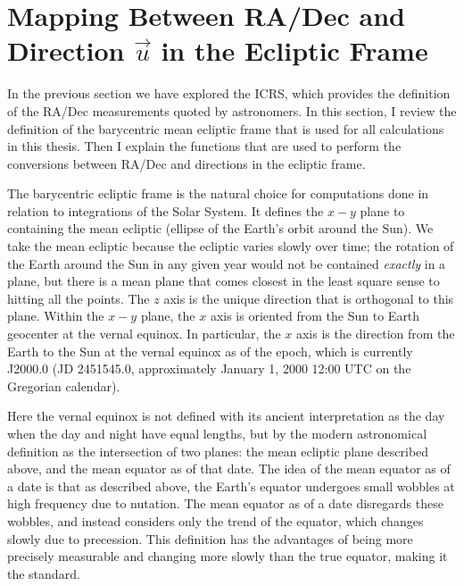 \section{Mapping Between RA/Dec and Direction $\vec{u}$ in the Ecliptic Frame}
\label{section_ra_dec_to_dir}
In the previous section we have explored the ICRS, which provides the definition of the RA/Dec measurements quoted by astronomers.
In this section, I review the definition of the barycentric mean ecliptic frame that is used for all calculations in this thesis.
Then I explain the functions that are used to perform the conversions between RA/Dec and directions in the ecliptic frame.

The barycentric ecliptic frame is the natural choice for computations done in relation to integrations of the Solar System.
It defines the $x-y$ plane to containing the mean ecliptic (ellipse of the Earth's orbit around the Sun).
We take the mean ecliptic because the ecliptic varies slowly over time; 
the rotation of the Earth around the Sun in any given year would not be contained \textit{exactly} in a plane,
but there is a mean plane that comes closest in the least square sense to hitting all the points.
The $z$ axis is the unique direction that is orthogonal to this plane.
Within the $x-y$ plane, the $x$ axis is oriented from the Sun to Earth geocenter at the vernal equinox.
In particular, the $x$ axis is the direction from the Earth to the Sun at the vernal equinox as of the epoch, 
which is currently J2000.0 (JD 2451545.0, approximately January 1, 2000 12:00 UTC on the Gregorian calendar).

Here the vernal equinox is not defined with its ancient interpretation as the day when the day and night have equal lengths,
but by the modern astronomical definition as the intersection of two planes:
the mean ecliptic plane described above, and the mean equator as of that date.
The idea of the mean equator as of a date is that as described above, the Earth's equator undergoes small wobbles at high frequency due to nutation.
The mean equator as of a date disregards these wobbles, and instead considers only the trend of the equator, which changes slowly due to precession.
This definition has the advantages of being more precisely measurable and changing more slowly than the true equator, making it the standard.

